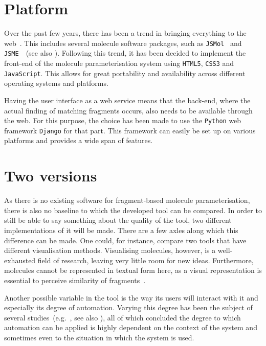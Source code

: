 \section{Platform}
Over the past few years, there has been a trend in bringing everything to the web~\cite{ertl2010molecular}. This includes several molecule software packages, such as \verb|JSMol|~\cite{hanson2013jsmol} and \verb|JSME|~\cite{bienfait2013jsme}~(see also ). Following this trend, it has been decided to implement the front-end of the molecule parameterisation system using \verb|HTML5|, \verb|CSS3| and \verb|JavaScript|. This allows for great portability and availability across different operating systems and platforms.

Having the user interface as a web service means that the back-end, where the actual finding of matching fragments occurs, also needs to be available through the web. For this purpose, the choice has been made to use the \verb|Python| web framework \verb|Django| for that part. This framework can easily be set up on various platforms and provides a wide span of features.


\section{Two versions}
As there is no existing software for fragment-based molecule parameterisation, there is also no baseline to which the developed tool can be compared. In order to still be able to say something about the quality of the tool, two different implementations of it will be made. There are a few axles along which this difference can be made. One could, for instance, compare two tools that have different visualisation methods. Visualising molecules, however, is a well-exhausted field of research, leaving very little room for new ideas. Furthermore, molecules cannot be represented in textual form here, as a visual representation is essential to perceive similarity of fragments~\cite{gallopoulos1994computer}.

Another possible variable in the tool is the way its users will interact with it and especially its degree of automation. Varying this degree has been the subject of several studies~(e.g.~\cite{payne2000varying, horvitz1999principles, marcus1987taking, norman1990problem}, see also ), all of which concluded the degree to which automation can be applied is highly dependent on the context of the system and sometimes even to the situation in which the system is used.

